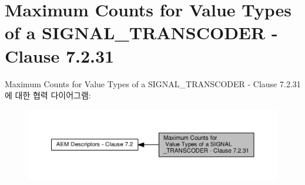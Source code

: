 \hypertarget{group__transcoder__values__type__max}{}\section{Maximum Counts for Value Types of a S\+I\+G\+N\+A\+L\+\_\+\+T\+R\+A\+N\+S\+C\+O\+D\+ER -\/ Clause 7.2.31}
\label{group__transcoder__values__type__max}
Maximum Counts for Value Types of a S\+I\+G\+N\+A\+L\+\_\+\+T\+R\+A\+N\+S\+C\+O\+D\+ER -\/ Clause 7.2.31에 대한 협력 다이어그램\+:
\nopagebreak
\begin{figure}[H]
\begin{center}
\leavevmode
\includegraphics[width=350pt]{group__transcoder__values__type__max}
\end{center}
\end{figure}
